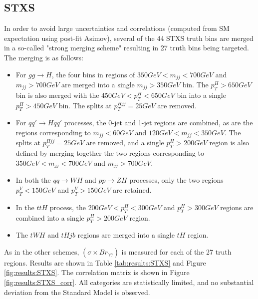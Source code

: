 \subsection{STXS} \label{sec:STXS}

In order to avoid large uncertainties and correlations (computed from SM expectation using post-fit Asimov), several of the 44 STXS truth bins are merged in a so-called "strong merging scheme" resulting in 27 truth bins being targeted. The merging is as follows:

\begin{itemize}
\item For $gg\rightarrow H$, the four bins in regions of $350 GeV < m_{jj} < 700 GeV$ and $m_{jj}> 700 GeV$ are merged into a single $m_{jj} > 350 GeV$ bin. The $p_{T}^{H} > 650 GeV$ bin is also merged with the $450 GeV < p_{T}^{H} < 650 GeV$ bin into a single $p_{T}^{H} > 450 GeV$ bin. The splits at $p_{T}^{Hjj}=25 GeV$ are removed.
\item For $qq' \rightarrow Hqq'$ processes, the 0-jet and 1-jet regions are combined, as are the regions corresponding to $m_{jj} < 60 GeV$ and $120 GeV < m_{jj} < 350 GeV$. The splits at $p_{T}^{Hjj}=25 GeV$ are removed, and a single  $p_{T}^{H} > 200 GeV$ region is also defined by merging together the two regions corresponding to $350 GeV < m_{jj}<700 GeV$ and $m_{jj}>700 GeV$.
\item In both the $qq \rightarrow WH$ and $pp \rightarrow ZH$ processes, only the two regions $p_{T}^{V} < 150 GeV$ and $p_{T}^{V} > 150 GeV$ are retained.
\item In the $ttH$ process, the $200 GeV < p_{T}^{H} < 300 GeV$ and $p_{T}^{H} > 300 GeV$ regions are combined into a single $p_{T}^{H} > 200 GeV$ region.
\item The $tWH$ and $tHjb$ regions are merged into a single $tH$ region.
\end{itemize}

As in the other schemes, $(\sigma \times Br_{\gamma \gamma})$ is measured for each of the 27 truth regions. Results are shown in Table \ref{tab:results:STXS} and Figure \ref{fig:results:STXS}. The correlation matrix is shown in Figure \ref{fig:results:STXS_corr}. All categories are statistically limited, and no substantial deviation from the Standard Model is observed.

